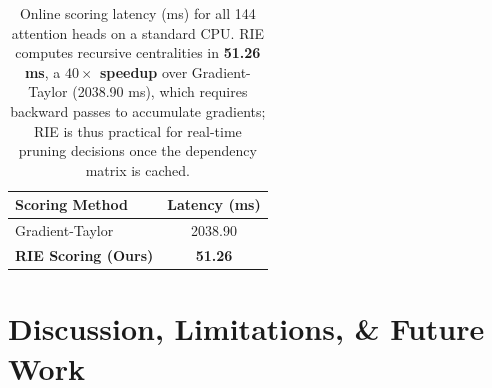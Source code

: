 \documentclass[11pt,a4paper]{article}
\theoremstyle{definition}
\theoremstyle{plain}
\begin{document}
\begin{table}[h]
\centering
\caption{Online scoring latency (ms) for all 144 attention heads on a standard CPU. RIE computes recursive centralities in \textbf{51.26 ms}, a \textbf{$40\times$ speedup} over Gradient-Taylor (2038.90 ms), which requires backward passes to accumulate gradients; RIE is thus practical for real-time pruning decisions once the dependency matrix is cached.}
\label{tab:latency}
\begin{tabular}{lc}
\toprule
\textbf{Scoring Method} & \textbf{Latency (ms)} \\
\midrule
Gradient-Taylor & 2038.90 \\
\textbf{RIE Scoring (Ours)} & \textbf{51.26} \\
\bottomrule
\end{tabular}
\end{table}

\begin{table}[h]
\centering
\caption{Experimental Protocol and Hyperparameter Configuration. The table details the evaluated models, evaluation datasets, calibration parameters (prompts and seeds), statistical significance settings (resamples and permutations), hardware environments, and network science constants (damping factor) used to ensure full scientific reproducibility.}
\label{tab:protocol}
\end{table}

\section{Discussion, Limitations, \& Future Work}
\label{sec:discussion}
\end{document}
